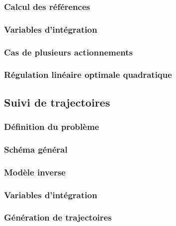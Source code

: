 \documentclass[11pt,a4paper]{article}
\begin{document}
\subsubsection{Calcul des références}
\subsubsection{Variables d'intégration}
\subsubsection{Cas de plusieurs actionnements}
\subsubsection{Régulation linéaire optimale quadratique}

\subsection{Suivi de trajectoires}

\subsubsection{Définition du problème}
\subsubsection{Schéma général}
\subsubsection{Modèle inverse}
\subsubsection{Variables d'intégration}
\subsubsection{Génération de trajectoires}
\end{document}

